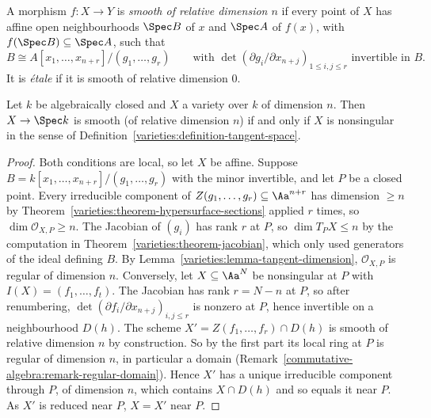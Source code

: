 \begin{definition}\label{schemes:definition-smooth}
A morphism $f \colon X \to Y$ is \emph{smooth of relative dimension $n$} if every point of $X$ has affine open neighbourhoods $\Spec B$ of $x$ and $\Spec A$ of
$f(x)$, with $f(\Spec B) \subseteq \Spec A$, such that
\[
B \cong A[x_1, \ldots, x_{n+r}]/(g_1, \ldots, g_r) \qquad \text{with } \det\left(\partial g_i/\partial x_{n+j}\right)_{1 \leq i,j \leq r} \text{ invertible in } B.
\]
It is \emph{\'etale} if it is smooth of relative dimension $0$.
\end{definition}

\begin{proposition}\label{schemes:proposition-smooth-nonsingular}
Let $k$ be algebraically closed and $X$ a variety over $k$ of dimension $n$. Then $X \to \Spec k$ is smooth (of relative dimension $n$) if and only if $X$
is nonsingular in the sense of Definition~\ref{varieties:definition-tangent-space}.
\end{proposition}

\begin{proof}
Both conditions are local, so let $X$ be affine. Suppose $B = k[x_1, \ldots, x_{n+r}]/(g_1, \ldots, g_r)$ with the minor invertible, and let $P$ be a closed point.
Every irreducible component of $Z(g_1, \ldots, g_r) \subseteq \Aa^{n+r}$ has dimension $\geq n$ by Theorem~\ref{varieties:theorem-hypersurface-sections} applied $r$
times, so $\dim\mathcal{O}_{X,P} \geq n$. The Jacobian of $(g_i)$ has rank $r$ at $P$, so $\dim T_PX \leq n$ by the computation in
Theorem~\ref{varieties:theorem-jacobian}, which only used generators of the ideal defining $B$. By Lemma~\ref{varieties:lemma-tangent-dimension},
$\mathcal{O}_{X,P}$ is regular of dimension $n$. Conversely, let $X \subseteq \Aa^N$ be nonsingular at $P$ with $I(X) = (f_1, \ldots, f_t)$. The Jacobian has rank
$r = N - n$ at $P$, so after renumbering, $\det(\partial f_i/\partial x_{n+j})_{i,j \leq r}$ is nonzero at $P$, hence invertible on a neighbourhood $D(h)$. The
scheme $X' = Z(f_1, \ldots, f_r) \cap D(h)$ is smooth of relative dimension $n$ by construction. So by the first part its local ring at $P$ is regular of dimension
$n$, in particular a domain (Remark~\ref{commutative-algebra:remark-regular-domain}). Hence $X'$ has a unique irreducible component through $P$, of dimension $n$, which contains
$X \cap D(h)$ and so equals it near $P$. As $X'$ is reduced near $P$, $X = X'$ near $P$.
\end{proof}

